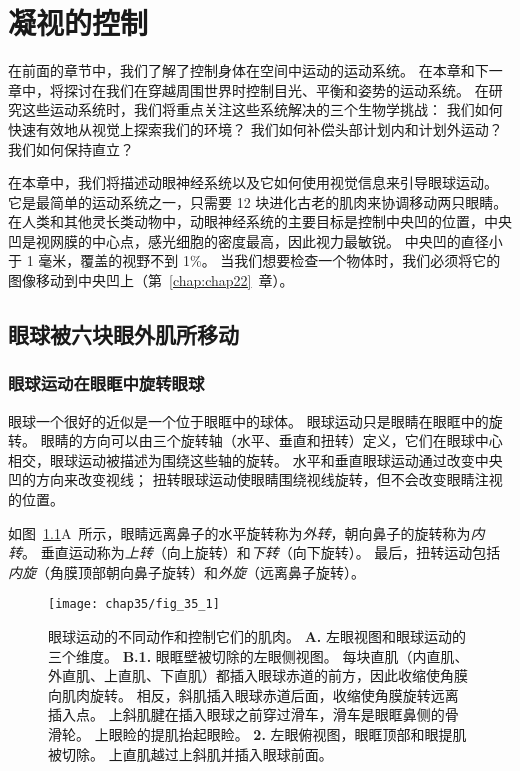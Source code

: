 \chapter{凝视的控制} \label{chap:chap35}

在前面的章节中，我们了解了控制身体在空间中运动的运动系统。
在本章和下一章中，将探讨在我们在穿越周围世界时控制目光、平衡和姿势的运动系统。
在研究这些运动系统时，我们将重点关注这些系统解决的三个生物学挑战：
我们如何快速有效地从视觉上探索我们的环境？
我们如何补偿头部计划内和计划外运动？
我们如何保持直立？


在本章中，我们将描述动眼神经系统以及它如何使用视觉信息来引导眼球运动。
它是最简单的运动系统之一，只需要 12 块进化古老的肌肉来协调移动两只眼睛。
在人类和其他灵长类动物中，动眼神经系统的主要目标是控制中央凹的位置，中央凹是视网膜的中心点，感光细胞的密度最高，因此视力最敏锐。
中央凹的直径小于 1 毫米，覆盖的视野不到 1\%。
当我们想要检查一个物体时，我们必须将它的图像移动到中央凹上（第~\ref{chap:chap22}~章）。



\section{眼球被六块眼外肌所移动}

\subsection{眼球运动在眼眶中旋转眼球}

眼球一个很好的近似是一个位于眼眶中的球体。
眼球运动只是眼睛在眼眶中的旋转。
眼睛的方向可以由三个旋转轴（水平、垂直和扭转）定义，它们在眼球中心相交，眼球运动被描述为围绕这些轴的旋转。
水平和垂直眼球运动通过改变中央凹的方向来改变视线；
扭转眼球运动使眼睛围绕视线旋转，但不会改变眼睛注视的位置。


如图~\ref{fig:35_1}A~所示，眼睛远离鼻子的水平旋转称为\textit{外转}，朝向鼻子的旋转称为\textit{内转}。 
垂直运动称为\textit{上转}（向上旋转）和\textit{下转}（向下旋转）。
最后，扭转运动包括\textit{内旋}（角膜顶部朝向鼻子旋转）和\textit{外旋}（远离鼻子旋转）。


\begin{figure}[htbp]
	\centering
	\texttt{[image: chap35/fig\_35\_1]}
	\caption{眼球运动的不同动作和控制它们的肌肉。
		\textbf{A.} 左眼视图和眼球运动的三个维度。
		\textbf{B.1.} 眼眶壁被切除的左眼侧视图。
		每块直肌（内直肌、外直肌、上直肌、下直肌）都插入眼球赤道的前方，因此收缩使角膜向肌肉旋转。
		相反，斜肌插入眼球赤道后面，收缩使角膜旋转远离插入点。
		上斜肌腱在插入眼球之前穿过滑车，滑车是眼眶鼻侧的骨滑轮。
		上眼睑的提肌抬起眼睑。
		\textbf{2.} 左眼俯视图，眼眶顶部和眼提肌被切除。 
		上直肌越过上斜肌并插入眼球前面。}
	\label{fig:35_1}
\end{figure}


